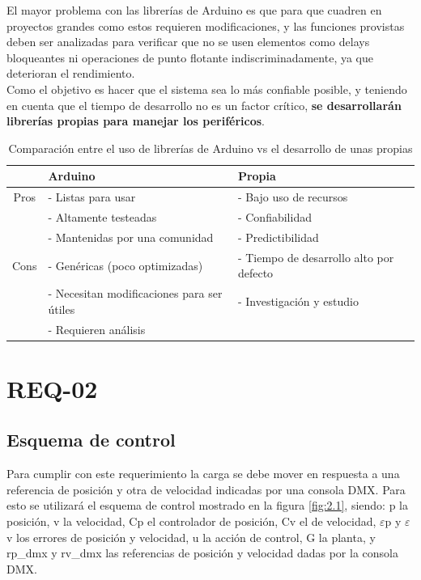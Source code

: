 El mayor problema con las librerías de Arduino es que para que cuadren en proyectos grandes como estos requieren modificaciones, y las funciones provistas deben ser analizadas para verificar que no se usen elementos como delays bloqueantes ni operaciones de punto flotante indiscriminadamente, ya que deterioran el rendimiento. \\
Como el objetivo es hacer que el sistema sea lo más confiable posible, y teniendo en cuenta que el tiempo de desarrollo no es un factor crítico, \textbf{se desarrollarán librerías propias para manejar los periféricos}.\\

\begin{table}[!ht]
	\begin{center}
		\begin{tabular}{|c|l|l|}
			\hline
			\rowcolor{OODlightblue}
			\textbf{} & \textbf{Arduino} & \textbf{Propia} \\
			\hline \hline
			Pros & - Listas para usar & - Bajo uso de recursos \\
			& - Altamente testeadas  & - Confiabilidad \\
			& - Mantenidas por una comunidad & - Predictibilidad \\
			\hline
			Cons & - Genéricas (poco optimizadas) & - Tiempo de desarrollo alto por defecto \\
			& - Necesitan modificaciones para ser útiles & - Investigación y estudio \\
			& - Requieren análisis &   \\
			\hline
		\end{tabular}
	\end{center}
	\caption{Comparación entre el uso de librerías de Arduino vs el desarrollo de unas propias}
	\label{table:\thetable}
\end{table}

\section{REQ-02} \label{sec:\thesection}
\subsection{Esquema de control}
Para cumplir con este requerimiento la carga se debe mover en respuesta a una referencia de posición y otra de velocidad indicadas por una consola DMX. Para esto se utilizará el esquema de control mostrado en la figura \ref{fig:2.1}, siendo: p la posición, v la velocidad,  Cp el controlador de posición, Cv el de velocidad, \(\varepsilon\)p y \(\varepsilon\)v los errores de posición y velocidad, u la acción de control, G la planta, y rp\_dmx y rv\_dmx las referencias de posición y velocidad dadas por la consola DMX.

